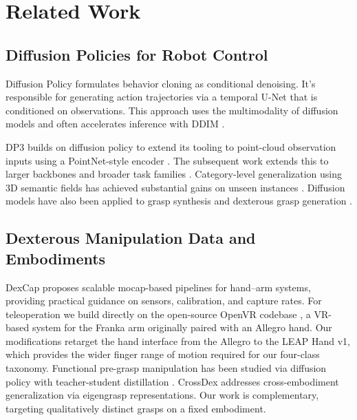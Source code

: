 \documentclass[letterpaper, 10pt, journal, twoside]{IEEEtran}
\begin{document}
\section{Related Work}
\subsection{Diffusion Policies for Robot Control}
Diffusion Policy \cite{chi2023diffusionpolicy} formulates behavior cloning as
conditional denoising. It's responsible for generating action trajectories via a
temporal U-Net that is conditioned on observations. This approach uses the
multimodality of diffusion models \cite{ho2020ddpm} and often accelerates inference
with DDIM \cite{song2021ddim}.

DP3 \cite{ze2024dp3} builds on diffusion policy to extend its tooling to point-cloud
observation inputs using a PointNet-style encoder \cite{qi2017pointnet}. The subsequent
work extends this to larger backbones and broader task families \cite{ze2024idp3}.
Category-level generalization using 3D semantic fields has achieved substantial gains
on unseen instances \cite{wang2024gendp}. Diffusion models have also been applied to
grasp synthesis and dexterous grasp generation \cite{weng2024dexdiffuser}.

\subsection{Dexterous Manipulation Data and Embodiments}
DexCap \cite{wang2024dexcap} proposes scalable mocap-based pipelines for hand--arm
systems, providing practical guidance on sensors, calibration, and capture rates. For
teleoperation we build directly on the open-source OpenVR codebase
\cite{george2023openvr}, a VR-based system for the Franka arm originally paired with an
Allegro hand. Our modifications retarget the hand interface from the Allegro to the
LEAP Hand v1, which provides the wider finger range of motion required for our
four-class taxonomy. Functional pre-grasp manipulation has been studied via diffusion
policy with teacher-student distillation \cite{wu2024unidexfpm}. CrossDex
\cite{crossdex2025} addresses cross-embodiment generalization via eigengrasp
representations. Our work is complementary, targeting qualitatively distinct grasps
on a fixed embodiment.
\end{document}
